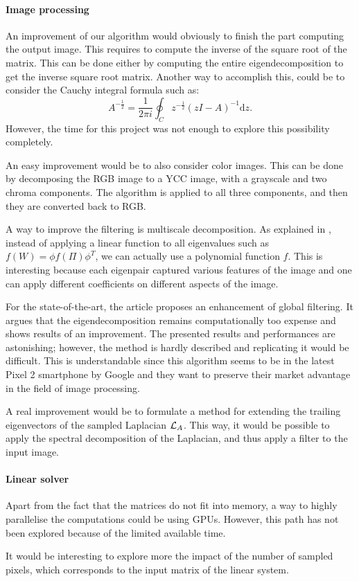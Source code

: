 \paragraph{Image processing}
An improvement of our algorithm would obviously to finish the part computing the output image.
This requires to compute the inverse of the square root of the matrix.
This can be done either by computing the entire eigendecomposition to get the inverse square root matrix.
Another way to accomplish this, could be to consider the Cauchy integral formula such as:
\[A^{-\frac{1}{2}} = \frac{1}{2\pi i} \oint_C z^{-\frac{1}{2}} (zI - A)^{-1} \mathrm{d}z.\]
However, the time for this project was not enough to explore this possibility completely.

An easy improvement would be to also consider color images.
This can be done by decomposing the RGB image to a YCC image, with a grayscale and two chroma components.
The algorithm is applied to all three components, and then they are converted back to RGB.

A way to improve the filtering is multiscale decomposition.
As explained in \cite{talebi_nonlocal_2014}, instead of applying a linear function to all eigenvalues such as \(f(W) = \phi f(\Pi) \phi^T\), we can actually use a polynomial function \(f\).
This is interesting because each eigenpair captured various features of the image and one can apply different coefficients on different aspects of the image.

For the state-of-the-art, the article \cite{talebi_fast_2016} proposes an enhancement of global filtering.
It argues that the eigendecomposition remains computationally too expense and shows results of an improvement.
The presented results and performances are astonishing; however, the method is hardly described and replicating it would be difficult.
This is understandable since this algorithm seems to be in the latest Pixel 2 smartphone by Google and they want to preserve their market advantage in the field of image processing.

A real improvement would be to formulate a method for extending the trailing eigenvectors of the sampled Laplacian \(\operatorname{\mathcal{L}}_A\).
This way, it would be possible to apply the spectral decomposition of the Laplacian, and thus apply a filter to the input image.

\paragraph{Linear solver}
Apart from the fact that the matrices do not fit into memory, a way to highly parallelise the computations could be using GPUs.
However, this path has not been explored because of the limited available time.

It would be interesting to explore more the impact of the number of sampled pixels, which corresponds to the input matrix of the linear system.
